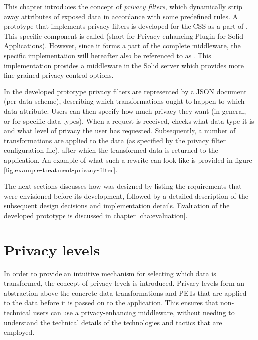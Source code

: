 \noindent This chapter introduces the concept of \textit{privacy filters}, which dynamically strip away attributes of exposed data in accordance with some predefined rules. A prototype that implements privacy filters is developed for the \gls{CSS} as a part of \middleware{}. This specific component is called \mwprivacy{} (short for Privacy-enhancing Plugin for Solid Applications). However, since it forms a part of the complete middleware, the specific implementation will hereafter also be referenced to as \middleware{}. This implementation provides a middleware in the Solid server which provides more fine-grained privacy control options. 

In the developed prototype privacy filters are represented by a JSON document (per data scheme), describing which transformations ought to happen to which data attribute. Users can then specify how much privacy they want (in general, or for specific data types). When a request is received, \middleware{} checks what data type it is and what level of privacy the user has requested. Subsequently, a number of transformations are applied to the data (as specified by the privacy filter configuration file), after which the transformed data is returned to the application. An example of what such a rewrite can look like is provided in figure \ref{fig:example-treatment-privacy-filter}.



\newpage
\noindent The next sections discusses how \middleware{} was designed by listing the requirements that were envisioned before its development, followed by a detailed description of the subsequent design decisions and implementation details. Evaluation of the developed prototype is discussed in chapter \ref{cha:evaluation}.



\section{Privacy levels}
\label{sec:privacylevels}
\noindent In order to provide an intuitive mechanism for selecting which data is transformed, the concept of privacy levels is introduced. Privacy levels form an abstraction above the concrete data transformations and \gls{PETs} that are applied to the data before it is passed on to the application. This ensures that non-technical users can use a privacy-enhancing middleware, without needing to understand the technical details of the technologies and tactics that are employed. 

